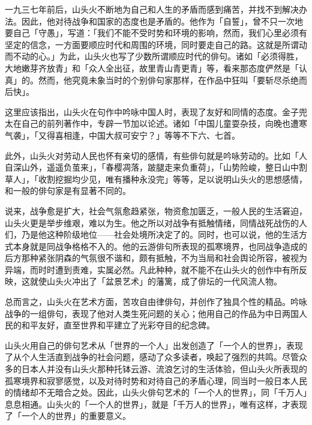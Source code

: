 {    一九三七年前后，山头火不断地为自己和人生的矛盾而感到痛苦，并找不到解决办法。因此，他对待战争和国家的态度也是矛盾的。他作为「自誓」，曾不只一次地要自己「守愚」\footnotemark[14]，写道：「我们不能不受时势和环境的影响，然而，我们心里必须有坚定的信念，一方面要顺应时代和周围的环境，同时要走自己的路。这就是所谓动而不动的心。」\footnotemark[15]为此，山头火也写了少数所谓顺应时代的俳句。诸如「必须得胜，大地嫩芽齐放青」和「众人全出征，故里青山青更青」等，看来那态度俨然是「认真」\footnotemark[16]的。然而，他究竟未象当时的个别俳句家那样，在作品中狂叫「要斩尽杀绝而后快」\footnotemark[17]。


    这里应该指出，山头火在句作中吟咏中国人时，表现了友好和同情的态度。金子兜太在自己的前列著作中，专辟一节加以论述。诸如「中国儿童耍杂技，向晚也遭寒气袭」，「又得喜相逢，中国大叔可安宁？」等等不下六、七首。

    此外，山头火对劳动人民也怀有亲切的感情，有些俳句就是吟咏劳动的。比如「人自深山外，遥遥负茧来」，「春樱凋落，跛腿走来负重荷」，「山势险峻，整日山中割草人」，「收割挖掘均少见，唯有播种永没完」等等，足以说明山头火的思想感情，和一般的俳句家是有显著不同的。

    说来，战争愈是扩大，社会气氛愈趋紧张，物资愈加匮乏，一般人民的生活窘迫，山头火更是举步维艰，难以为生。他之所以对战争有抵触情绪，同情战死战伤的人们，乃是他这种阶级地位——社会处境所决定了的。同时，也可以说，他的生活方式本身就是同战争格格不入的。他的云游俳句所表现的孤寒境界，也同战争造成的后方那种紧张阴森的气氛很不谐和，颇有抵触，不为当局和社会舆论所容，被视为异端，而时时遭到责难，实属必然。凡此种种，就不能不在山头火的创作中有所反映，这就使山头火冲出了「盆景艺术」的藩篱，成了俳坛的一代风流人物。

    总而言之，山头火在艺术方面，苦攻自由律俳句，并创作了独具个性的精品。吟咏战争的一组俳句，表现了他对人类生死问题的关心；他用自己的作品为中日两国人民的和平友好，直至世界和平建立了光彩夺目的纪念碑。

    山头火用自己的俳句艺术从「世界的一个人」出发创造了「一个人的世界」，表现了从个人生活直到战争的社会问题，感动了众多读者，唤起了强烈的共鸣。尽管众多的日本人并没有山头火那种托钵云游、流浪乞讨的生活体验，但山头火所表现的孤寒境界和寂寥感觉，以及对待时势和对待自己的矛盾心理，同当时一般日本人民的情绪却不无暗合之处。因此，山头火俳句艺术的「一个人的世界」，同「千万人」息息相通。山头火的「一个人的世界」，就是「千万人的世界」，唯有这样，才表现了「一个人的世界」的重要意义。

}
